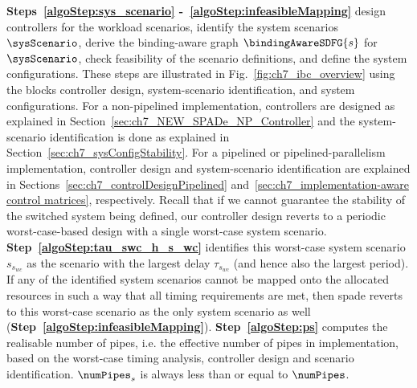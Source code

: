 \textbf{Steps~\ref{algoStep:sys_scenario} -~\ref{algoStep:infeasibleMapping}} design controllers for the workload scenarios, identify the system scenarios $\sysScenario$, derive the binding-aware graph $\bindingAwareSDFG{s}$ for $\sysScenario$, check feasibility of the scenario definitions, and define the system configurations.
These steps are illustrated in Fig.~\ref{fig:ch7_ibc_overview} using the blocks controller design, system-scenario identification, and system configurations.
For a non-pipelined implementation, controllers are designed as explained in Section~\ref{sec:ch7_NEW_SPADe_NP_Controller} and the system-scenario identification is done as explained in Section~\ref{sec:ch7_sysConfigStability}.
For a pipelined or pipelined-parallelism implementation, controller design and system-scenario identification are explained in Sections~\ref{sec:ch7_controlDesignPipelined} and~\ref{sec:ch7_implementation-aware control matrices}, respectively.
Recall that if we cannot guarantee the stability of the switched system being defined, our controller design reverts to a periodic worst-case-based design with a single worst-case system scenario. \textbf{Step~\ref{algoStep:tau_swc_h_s_wc}} identifies this worst-case system scenario $s_{s_{wc}}$ as the scenario with the largest delay $\tau_{s_{wc}}$ (and hence also the largest period). If any of the identified system scenarios cannot be mapped onto the allocated resources in such a way that all timing requirements are met, then \gls{spade} reverts to this worst-case scenario as the only system scenario as well (\textbf{Step~\ref{algoStep:infeasibleMapping}}).
\textbf{Step~\ref{algoStep:ps}} computes the realisable number of pipes, i.e. the effective number of pipes in implementation, based on the worst-case timing analysis, controller design and scenario identification. $\numPipes_s$ is always less than or equal to $\numPipes$. 

